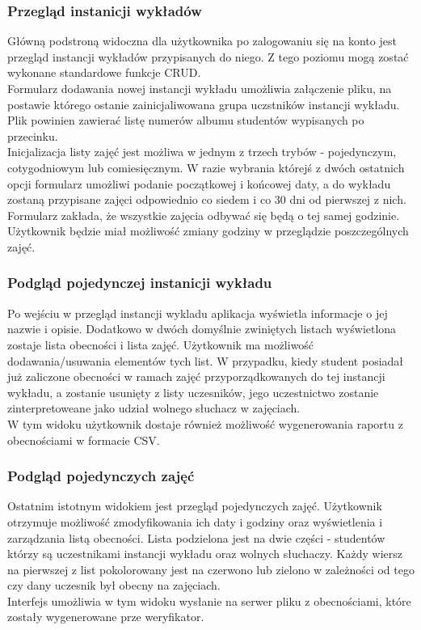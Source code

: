 \documentclass[declaration,shortabstract, mgr]{iithesis}
\begin{document}
\subsubsection{Przegląd instanicji wykładów}
\indent Główną podstroną widoczna dla użytkownika po zalogowaniu się na konto jest przegląd instancji wykładów przypisanych do niego. Z tego poziomu mogą zostać wykonane standardowe funkcje CRUD\cite{crud}.\\
\indent Formularz dodawania nowej instancji wykładu umożliwia załączenie pliku, na postawie którego ostanie zainicjaliwowana grupa uczstników instancji wykładu. Plik powinien zawierać listę numerów albumu studentów wypisanych po przecinku.\\
\indent Inicjalizacja listy zajęć jest możliwa w jednym z trzech trybów - pojedynczym, cotygodniowym lub comiesięcznym. W razie wybrania którejś z dwóch ostatnich opcji formularz umożliwi podanie początkowej i końcowej daty, a do wykładu zostaną przypisane zajęci odpowiednio co siedem i co 30 dni od pierwszej z nich. Formularz zakłada, że wszystkie zajęcia odbywać się będą o tej samej godzinie. Użytkownik będzie miał możliwość zmiany godziny w przeglądzie poszczególnych zajęć.\\
\subsubsection{Podgląd pojedynczej instanicji wykładu}
\indent Po wejściu w przegląd instancji wykladu aplikacja wyświetla informacje o jej nazwie i opisie. Dodatkowo w dwóch domyślnie zwiniętych listach wyświetlona zostaje lista obecności i lista zajęć. Użytkownik ma możliwość dodawania/usuwania elementów tych list. W przypadku, kiedy student posiadał już zaliczone obecności w ramach zajęć przyporządkowanych do tej instancji wykładu, a zostanie usunięty z listy uczesników, jego uczestnictwo zostanie zinterpretoweane jako udział wolnego słuchacz w zajęciach.\\
\indent W tym widoku użytkownik dostaje również możliwość wygenerowania raportu z obecnościami w formacie CSV.\\
\subsubsection{Podgląd pojedynczych zajęć}
\indent Ostatnim istotnym widokiem jest przegląd pojedynczych zajęć. Użytkownik otrzymuje możliwość zmodyfikowania ich daty i godziny oraz wyświetlenia i zarządzania listą obecności. Lista podzielona jest na dwie części - studentów którzy są uczestnikami instancji wykładu oraz wolnych słuchaczy. Każdy wiersz na pierwszej z list pokolorowany jest na czerwono lub zielono w zależności od tego czy dany uczesnik był obecny na zajęciach. \\
\indent Interfejs umożliwia w tym widoku wysłanie na serwer pliku z obecnościami, które zostały wygenerowane prze weryfikator.\\
\end{document}
